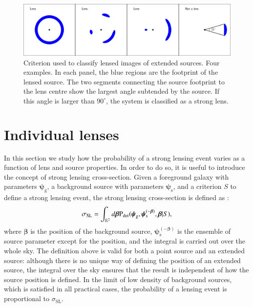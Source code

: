 \documentclass{aa}
\def\psilens{\boldsymbol{\psi}_\mathrm{g}}
\def\psisource{\boldsymbol{\psi}_\mathrm{s}}
\def\psisourcenobeta{\boldsymbol{\psi}_\mathrm{s}^{(-\boldsymbol\beta)}}
\def\pdet{{\rm P}_\mathrm{det}}
\def\crosssect{\sigma_\mathrm{{SL}}}
\begin{document}
\begin{figure}
\includegraphics[width=\textwidth]{footprints.eps}
\caption{
Criterion used to classify lensed images of extended sources. Four examples. In each panel, the blue regions are the footprint of the lensed source. 
The two segments connecting the source footprint to the lens centre show the largest angle subtended by the source. If this angle is larger than $90^\circ$, the system is classified as a strong lens.
\label{fig:lensdef}
}
\end{figure}

\section{Individual lenses}\label{sect:indlenses}

In this section we study how the probability of a strong lensing event varies as a function of lens and source properties.
In order to do so, it is useful to introduce the concept of strong lensing cross-section.
Given a foreground galaxy with parameters $\psilens$, a background source with parameters $\psisource$, and a criterion $S$ to define a strong lensing event, the strong lensing cross-section is defined as \citep{Son22}:
\begin{equation}\label{eq:crosssect}
\crosssect = \int_{\mathbb{R}^2} d\boldsymbol\beta \pdet(\psilens,\psisourcenobeta,\boldsymbol\beta|S),
\end{equation}
where $\boldsymbol\beta$ is the position of the background source, $\psisourcenobeta$ is the ensemble of source parameter except for the position, and the integral is carried out over the whole sky.
The definition above is valid for both a point source and an extended source: although there is no unique way of defining the position of an extended source, the integral over the sky ensures that the result is independent of how the source position is defined.
In the limit of low density of background sources, which is satisfied in all practical cases, the probability of a lensing event is proportional to $\crosssect$.
\end{document}
